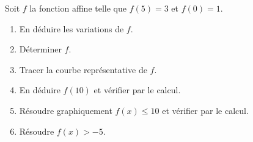 
Soit $f$ la fonction affine telle que $f(5)=3$ et $f(0)=1$.
\begin{enumerate}
\item En déduire les variations de $f$.
\item Déterminer $f$.
\item Tracer la courbe représentative de $f$.
\item En déduire $f(10)$ et vérifier par le calcul.
\item Résoudre graphiquement $f(x)\leq 10$ et vérifier par le calcul.
\item Résoudre $f(x)>-5$.
\end{enumerate}
